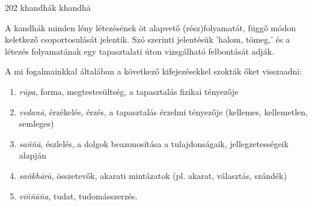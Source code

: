 
\begin{notesdescription}

\item[{202}
{khandhák}
{khandhā}] \hfill\par

A kandhák minden lény létezésének öt alapvető (rész)folyamatát, függő módon keletkező csoportosulását jelentik. Szó szerinti jelentésük 'halom, tömeg,' és a létezés folyamatának egy tapasztalati úton vizsgálható felbontását adják.

A mi fogalmainkkal általában a következő kifejezésekkel szokták őket visszaadni:

\begin{enumerate}
    \item \textit{r\=upa}, forma, megtestesültség, a tapasztalás fizikai tényezője
    \item \textit{vedan\=a}, érzékelés, érzés, a tapasztalás érzelmi tényezője (kellemes, kellemetlen, semleges)
    \item \textit{sa\~n\~n\=a}, észlelés, a dolgok beazonosítása a tulajdonságaik, jellegzetességeik alapján
    \item \textit{sa\.nkh\=ar\=a}, összetevők, akarati mintázatok (pl. akarat, választás, szándék)
    \item \textit{vi\~n\~n\=a\.na}, tudat, tudomásszerzés.
\end{enumerate}

\end{notesdescription}

